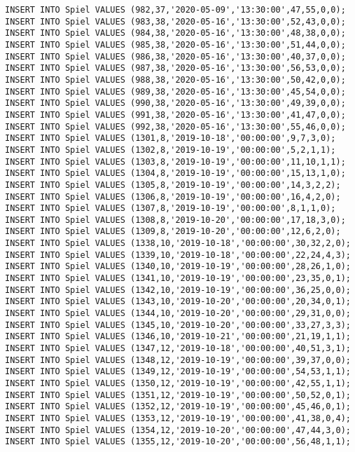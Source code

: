 \documentclass{lehramt-informatik-aufgabe}
\begin{document}
\begin{verbatim}
INSERT INTO Spiel VALUES (982,37,'2020-05-09','13:30:00',47,55,0,0);
INSERT INTO Spiel VALUES (983,38,'2020-05-16','13:30:00',52,43,0,0);
INSERT INTO Spiel VALUES (984,38,'2020-05-16','13:30:00',48,38,0,0);
INSERT INTO Spiel VALUES (985,38,'2020-05-16','13:30:00',51,44,0,0);
INSERT INTO Spiel VALUES (986,38,'2020-05-16','13:30:00',40,37,0,0);
INSERT INTO Spiel VALUES (987,38,'2020-05-16','13:30:00',56,53,0,0);
INSERT INTO Spiel VALUES (988,38,'2020-05-16','13:30:00',50,42,0,0);
INSERT INTO Spiel VALUES (989,38,'2020-05-16','13:30:00',45,54,0,0);
INSERT INTO Spiel VALUES (990,38,'2020-05-16','13:30:00',49,39,0,0);
INSERT INTO Spiel VALUES (991,38,'2020-05-16','13:30:00',41,47,0,0);
INSERT INTO Spiel VALUES (992,38,'2020-05-16','13:30:00',55,46,0,0);
INSERT INTO Spiel VALUES (1301,8,'2019-10-18','00:00:00',9,7,3,0);
INSERT INTO Spiel VALUES (1302,8,'2019-10-19','00:00:00',5,2,1,1);
INSERT INTO Spiel VALUES (1303,8,'2019-10-19','00:00:00',11,10,1,1);
INSERT INTO Spiel VALUES (1304,8,'2019-10-19','00:00:00',15,13,1,0);
INSERT INTO Spiel VALUES (1305,8,'2019-10-19','00:00:00',14,3,2,2);
INSERT INTO Spiel VALUES (1306,8,'2019-10-19','00:00:00',16,4,2,0);
INSERT INTO Spiel VALUES (1307,8,'2019-10-19','00:00:00',8,1,1,0);
INSERT INTO Spiel VALUES (1308,8,'2019-10-20','00:00:00',17,18,3,0);
INSERT INTO Spiel VALUES (1309,8,'2019-10-20','00:00:00',12,6,2,0);
INSERT INTO Spiel VALUES (1338,10,'2019-10-18','00:00:00',30,32,2,0);
INSERT INTO Spiel VALUES (1339,10,'2019-10-18','00:00:00',22,24,4,3);
INSERT INTO Spiel VALUES (1340,10,'2019-10-19','00:00:00',28,26,1,0);
INSERT INTO Spiel VALUES (1341,10,'2019-10-19','00:00:00',23,35,0,1);
INSERT INTO Spiel VALUES (1342,10,'2019-10-19','00:00:00',36,25,0,0);
INSERT INTO Spiel VALUES (1343,10,'2019-10-20','00:00:00',20,34,0,1);
INSERT INTO Spiel VALUES (1344,10,'2019-10-20','00:00:00',29,31,0,0);
INSERT INTO Spiel VALUES (1345,10,'2019-10-20','00:00:00',33,27,3,3);
INSERT INTO Spiel VALUES (1346,10,'2019-10-21','00:00:00',21,19,1,1);
INSERT INTO Spiel VALUES (1347,12,'2019-10-18','00:00:00',40,51,3,1);
INSERT INTO Spiel VALUES (1348,12,'2019-10-19','00:00:00',39,37,0,0);
INSERT INTO Spiel VALUES (1349,12,'2019-10-19','00:00:00',54,53,1,1);
INSERT INTO Spiel VALUES (1350,12,'2019-10-19','00:00:00',42,55,1,1);
INSERT INTO Spiel VALUES (1351,12,'2019-10-19','00:00:00',50,52,0,1);
INSERT INTO Spiel VALUES (1352,12,'2019-10-19','00:00:00',45,46,0,1);
INSERT INTO Spiel VALUES (1353,12,'2019-10-19','00:00:00',41,38,0,4);
INSERT INTO Spiel VALUES (1354,12,'2019-10-20','00:00:00',47,44,3,0);
INSERT INTO Spiel VALUES (1355,12,'2019-10-20','00:00:00',56,48,1,1);

\end{verbatim}
\end{document}

